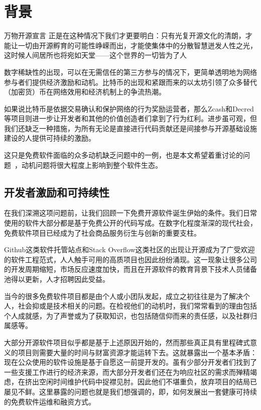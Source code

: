 \section{背景}

\begin{epigraph}{万物开源宣言}
    \noindent 正是在这种情况下我们才更要明白：只有光复开源文化的清朗，才能让一切由开源孵育的可能性峥嵘而出，才能使集体中的分散智慧迸发人性之光，这时候人间居所也将宛如天堂——这个世界的一切皆为了人
\end{epigraph}

\noindent 数字稀缺性的出现，可以在无需信任的第三方参与的情况下，更简单透明地为网络参与者们提供经济激励和动机。比特币的出现和紧跟而来的以太坊引领了众多替代（加密货）币在网络效用和经济机制上的争流热潮。

如果说比特币是依据交易确认和保护网络的行为奖励运营者，那么Zcash和Decred等项目则进一步让开发者和其他的价值创造者们拿到了行为红利。进步虽可观，但我们还缺乏一种措施，为所有无论是直接进行代码贡献还是间接参与开源基础设施建设的人提供可持续的激励。

这只是免费软件面临的众多动机缺乏问题中的一例，也是本文希望着重讨论的问题~\cite{roads and bridges}，动机问题将很大程度上影响到整个软件生态。

\subsection{开发者激励和可持续性}
\label{s:incentives}

在我们深溯这项问题前，让我们回顾一下免费开源软件诞生伊始的条件。我们日常使用的软件大部分都是基于免费公开的代码写成。在数字化程度渐深的现代社会，免费软件项目已经成为了社会商品服务衍生与创新的重要支柱。

Github这类软件托管站点和Stack Overflow这类社区的出现让开源成为了广受欢迎的软件工程范式，人人触手可用的高质项目也因此纷纷涌现。这一现象让很多公司的开发周期缩短，市场反应速度加快，而且在开源软件的教育背景下技术人员储备池得以更新，人才招聘因此受益。

当今的很多免费软件项目都是由个人或小团队发起，成立之初往往是为了解决个人，社会抑或是技术相关的问题。在检视他们的动机时，我们常常看到的理由包括个人成就感，为了声誉或为了获取知识，也包括随信仰而来的责任感，以及社群归属感等。

大部分开源软件项目似乎都是基于上述原因开始的，然而那些真正具有里程碑式意义的项目则需要大量的时间与财富资源才能运转下去。这就暴露出一个基本矛盾：现在公众使用的软件设施是基于自愿这一前提开发的。虽有少部分开发者们找到了一些支援工作进行的经济来源，而大部分开发者们还在为响应社区的需求而殚精竭虑，在挤出空闲时间维护代码中捉襟见肘。因此他们不堪重负，放弃项目的结局已屡见不鲜。这里暴露的问题也就是我们想强调的，即，如何发展出一套健康可持续的免费软件运维和融资方式。